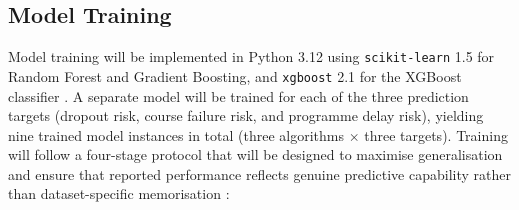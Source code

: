 \documentclass[12pt]{report}
\begin{document}
\subsection{Model Training}

Model training will be implemented in Python 3.12 using \texttt{scikit-learn} 1.5
for Random Forest and Gradient Boosting, and \texttt{xgboost} 2.1 for the
XGBoost classifier \parencite{pedregosa2011scikit, chen2016}. A separate
model will be trained for each of the three prediction targets (dropout risk, course
failure risk, and programme delay risk), yielding nine trained model instances
in total (three algorithms $\times$ three targets). Training will follow a
four-stage protocol that will be designed to maximise generalisation and ensure that
reported performance reflects genuine predictive capability rather than
dataset-specific memorisation \parencite{aldowah2026, bettahi2025}:
\end{document}
